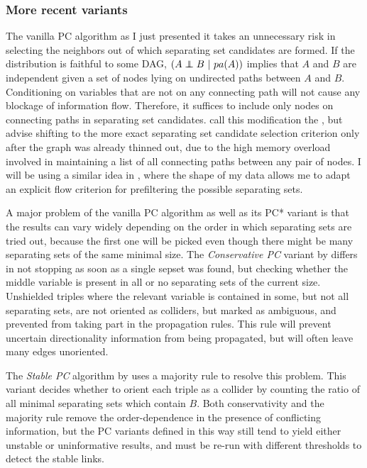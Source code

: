 \subsubsection{More recent variants}
The vanilla PC algorithm as I just presented it takes an unnecessary risk in selecting the neighbors out of which separating set candidates are formed. If the distribution is faithful to some DAG, $(A \indep B\ |\ pa(A))$ implies that $A$ and $B$ are independent given a set of nodes lying on undirected paths between $A$ and $B$. Conditioning on variables that are not on any connecting path will not cause any blockage of information flow. Therefore, it suffices to include only nodes on connecting paths in separating set candidates. \citet[5.4.2.3]{spirtes_ea_2000} call this modification the \textit{}, but advise shifting to the more exact separating set candidate selection criterion only after the graph was already thinned out, due to the high memory overload involved in maintaining a list of all connecting paths between any pair of nodes. I will be using a similar idea in , where the shape of my data allows me to adapt an explicit flow criterion for prefiltering the possible 
separating sets.

A major problem of the vanilla PC algorithm as well as its PC* variant is that the results can vary widely depending on the order in which separating sets are tried out, because the first one will be picked even though there might be many separating sets of the same minimal size. The \textit{Conservative PC} variant by \cite{ramsey_ea_2006} differs in not stopping as soon as a single sepset was found, but checking whether the middle variable is present in all or no separating sets of the current size. Unshielded triples where the relevant variable is contained in some, but not all separating sets, are not oriented as colliders, but marked as ambiguous, and prevented from taking part in the propagation rules. This rule will prevent uncertain directionality information from being propagated, but will often leave many edges unoriented.

The \textit{Stable PC} algorithm by \cite{colombo_maathuis_2014} uses a majority rule to resolve this problem. This variant decides whether to orient each triple as a collider by counting the ratio of all minimal separating sets which contain $B$. Both conservativity and the majority rule remove the order-dependence in the presence of conflicting information, but the PC variants defined in this way still tend to yield either unstable or uninformative results, and must be re-run with different thresholds to detect the stable links.

